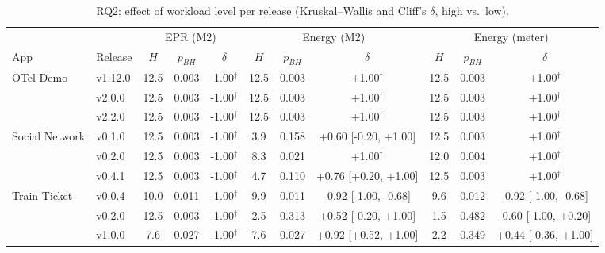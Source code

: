 \begin{table}[t]
\centering
\caption{RQ2: effect of workload level per release (Kruskal--Wallis and Cliff's $\delta$, high vs.\ low).}
\label{tab:rq2-workload}
\small
\setlength{\tabcolsep}{4pt}
\begin{tabular}{ll ccc ccc ccc}
\toprule
 & & \multicolumn{3}{c}{EPR (M2)} & \multicolumn{3}{c}{Energy (M2)} & \multicolumn{3}{c}{Energy (meter)} \\
\cmidrule(lr){3-5}\cmidrule(lr){6-8}\cmidrule(lr){9-11}
App & Release & $H$ & $p_{BH}$ & $\delta$ & $H$ & $p_{BH}$ & $\delta$ & $H$ & $p_{BH}$ & $\delta$ \\
\midrule
OTel Demo & v1.12.0 & 12.5 & 0.003 & -1.00$^\dagger$ & 12.5 & 0.003 & +1.00$^\dagger$ & 12.5 & 0.003 & +1.00$^\dagger$ \\
 & v2.0.0 & 12.5 & 0.003 & -1.00$^\dagger$ & 12.5 & 0.003 & +1.00$^\dagger$ & 12.5 & 0.003 & +1.00$^\dagger$ \\
 & v2.2.0 & 12.5 & 0.003 & -1.00$^\dagger$ & 12.5 & 0.003 & +1.00$^\dagger$ & 12.5 & 0.003 & +1.00$^\dagger$ \\
\midrule
Social Network & v0.1.0 & 12.5 & 0.003 & -1.00$^\dagger$ & 3.9 & 0.158 & +0.60 [-0.20, +1.00] & 12.5 & 0.003 & +1.00$^\dagger$ \\
 & v0.2.0 & 12.5 & 0.003 & -1.00$^\dagger$ & 8.3 & 0.021 & +1.00$^\dagger$ & 12.0 & 0.004 & +1.00$^\dagger$ \\
 & v0.4.1 & 12.5 & 0.003 & -1.00$^\dagger$ & 4.7 & 0.110 & +0.76 [+0.20, +1.00] & 12.5 & 0.003 & +1.00$^\dagger$ \\
\midrule
Train Ticket & v0.0.4 & 10.0 & 0.011 & -1.00$^\dagger$ & 9.9 & 0.011 & -0.92 [-1.00, -0.68] & 9.6 & 0.012 & -0.92 [-1.00, -0.68] \\
 & v0.2.0 & 12.5 & 0.003 & -1.00$^\dagger$ & 2.5 & 0.313 & +0.52 [-0.20, +1.00] & 1.5 & 0.482 & -0.60 [-1.00, +0.20] \\
 & v1.0.0 & 7.6 & 0.027 & -1.00$^\dagger$ & 7.6 & 0.027 & +0.92 [+0.52, +1.00] & 2.2 & 0.349 & +0.44 [-0.36, +1.00] \\
\bottomrule
\end{tabular}
\end{table}
